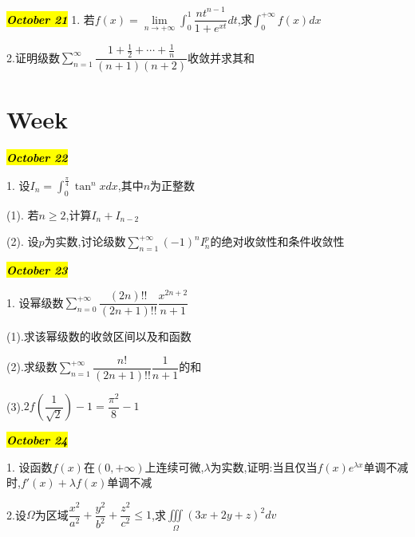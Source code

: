 \hl{\textbf{\textit{October 21}}}
1. 若$f(x)=\lim\limits_{n\rightarrow+\infty}\int_{0}^{1}\dfrac{nt^{n-1}}{1+e^{xt}}dt$,求$\int_{0}^{+\infty}f(x)dx$
\begin{solution}
	
\end{solution}

2.证明级数$\sum\limits_{n=1}^{\infty}\dfrac{1+\frac{1}{2}+\cdots+\frac{1}{n}}{(n+1)(n+2)}$收敛并求其和
\begin{solution}
	
\end{solution}
\section{Week }

\hl{\textbf{\textit{October 22}}}

1. 设$I_{n}=\int_{0}^{\frac{\pi}{4}}\tan^{n}xdx$,其中$n$为正整数

(1). 若$n\geq 2$,计算$I_{n}+I_{n-2}$

(2). 设$p$为实数,讨论级数$\sum\limits_{n=1}^{+\infty}(-1)^{n}I_{n}^{p}$的绝对收敛性和条件收敛性
\begin{solution}
	
\end{solution}

\hl{\textbf{\textit{October 23}}}

1. 设幂级数$\sum\limits_{n=0}^{+\infty}\dfrac{(2n)!!}{(2n+1)!!}\dfrac{x^{2n+2}}{n+1}$

(1).求该幂级数的收敛区间以及和函数

(2).求级数$\sum\limits_{n=1}^{+\infty}\dfrac{n!}{(2n+1)!!}\dfrac{1}{n+1}$的和

(3).$2f(\dfrac{1}{\sqrt{2}})-1=\dfrac{\pi^{2}}{8}-1$
\begin{solution}
	
\end{solution}

\hl{\textbf{\textit{October 24}}}

1. 设函数$f(x)$在$(0,+\infty)$上连续可微,$\lambda$为实数,证明:当且仅当$f(x)e^{\lambda x}$单调不减时,$f'(x)+\lambda f(x)$单调不减
\begin{solution}
	
\end{solution}

2.设$\Omega$为区域$\dfrac{x^{2}}{a^{2}}+\dfrac{y^{2}}{b^{2}}+\dfrac{z^{2}}{c^{2}}\leq 1$,求$\iiint\limits_{\Omega}(3x+2y+z)^{2}dv$
\begin{solution}
	
\end{solution}

